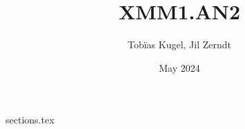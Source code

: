 \documentclass[a4paper, fontsize = 8pt, landscape]{scrartcl}
\title{XMM1.AN2}
\author{Tobïas Kugel, Jil Zerndt}
\date{May 2024}
\begin{document}
\begin{multicols*}{3}
    {sections.tex}
\end{multicols*}
\end{document}

